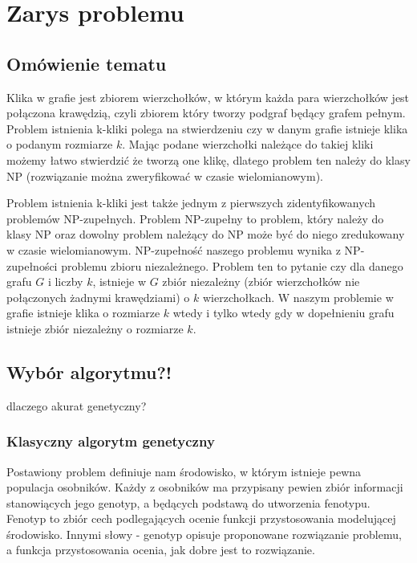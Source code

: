 \documentclass[11pt]{aghdpl}
\author{Wojciech Kasperek, Krzysztof Spytkowski, Izabela Śmietana}
\date{2014}
\begin{document}
\titlepages

\tableofcontents
\clearpage

\chapter{Zarys problemu}
\label{cha:zarys}

\section{Omówienie tematu}
\label{sec:omowienie}
 
Klika w grafie jest zbiorem wierzchołków, w którym każda para wierzchołków jest połączona krawędzią, czyli zbiorem który tworzy podgraf będący grafem pełnym. Problem istnienia k-kliki polega na stwierdzeniu czy w danym grafie istnieje klika o podanym rozmiarze $k$. Mając podane wierzchołki należące do takiej kliki możemy łatwo stwierdzić że tworzą one klikę, dlatego problem ten należy do klasy NP (rozwiązanie można zweryfikować w czasie wielomianowym).

Problem istnienia k-kliki jest także jednym z pierwszych zidentyfikowanych problemów NP-zupełnych. Problem NP-zupełny to problem, który należy do klasy NP oraz dowolny problem należący do NP może być do niego zredukowany w czasie wielomianowym. NP-zupełność naszego problemu wynika z NP-zupełności problemu zbioru niezależnego. Problem ten to pytanie czy dla danego grafu $G$ i liczby $k$, istnieje w $G$ zbiór niezależny (zbiór wierzchołków nie połączonych żadnymi krawędziami) o $k$ wierzchołkach. W naszym problemie w grafie istnieje klika o rozmiarze $k$ wtedy i tylko wtedy gdy w dopełnieniu grafu istnieje zbiór niezależny o rozmiarze $k$.

\section{Wybór algorytmu?!}
\label{sec:alg}
dlaczego akurat genetyczny?
\subsection{Klasyczny algorytm genetyczny}
\label{subsec:algGenetyczne}
Postawiony problem definiuje nam środowisko, w którym istnieje pewna populacja osobników. Każdy z osobników ma przypisany pewien zbiór informacji stanowiących jego genotyp, a będących podstawą do utworzenia
fenotypu. Fenotyp to zbiór cech podlegających ocenie funkcji przystosowania modelującej środowisko.
Innymi słowy - genotyp opisuje proponowane rozwiązanie problemu, a funkcja przystosowania ocenia, jak
dobre jest to rozwiązanie.
\end{document}
